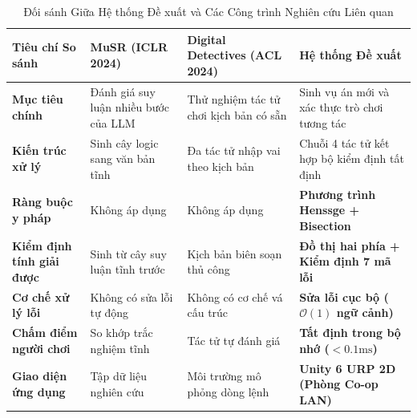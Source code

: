 \begin{table}[H]
\centering
\caption{Đối sánh Giữa Hệ thống Đề xuất và Các Công trình Nghiên cứu Liên quan}
\label{tab:related_works_comparison}
\begin{tabularx}{\textwidth}{l X X X}
\toprule
\textbf{Tiêu chí So sánh} & \textbf{MuSR (ICLR 2024)} & \textbf{Digital Detectives (ACL 2024)} & \textbf{Hệ thống Đề xuất} \\
\midrule
\textbf{Mục tiêu chính} & Đánh giá suy luận nhiều bước của LLM & Thử nghiệm tác tử chơi kịch bản có sẵn & Sinh vụ án mới và xác thực trò chơi tương tác \\
\textbf{Kiến trúc xử lý} & Sinh cây logic sang văn bản tĩnh & Đa tác tử nhập vai theo kịch bản & Chuỗi 4 tác tử kết hợp bộ kiểm định tất định \\
\textbf{Ràng buộc y pháp} & Không áp dụng & Không áp dụng & \textbf{Phương trình Henssge + Bisection} \\
\textbf{Kiểm định tính giải được} & Sinh từ cây suy luận tĩnh trước & Kịch bản biên soạn thủ công & \textbf{Đồ thị hai phía + Kiểm định 7 mã lỗi} \\
\textbf{Cơ chế xử lý lỗi} & Không có sửa lỗi tự động & Không có cơ chế vá cấu trúc & \textbf{Sửa lỗi cục bộ ($\mathcal{O}(1)$ ngữ cảnh)} \\
\textbf{Chấm điểm người chơi} & So khớp trắc nghiệm tĩnh & Tác tử tự đánh giá & \textbf{Tất định trong bộ nhớ ($< 0.1\text{ms}$)} \\
\textbf{Giao diện ứng dụng} & Tập dữ liệu nghiên cứu & Môi trường mô phỏng dòng lệnh & \textbf{Unity 6 URP 2D (Phòng Co-op LAN)} \\
\bottomrule
\end{tabularx}
\end{table}
